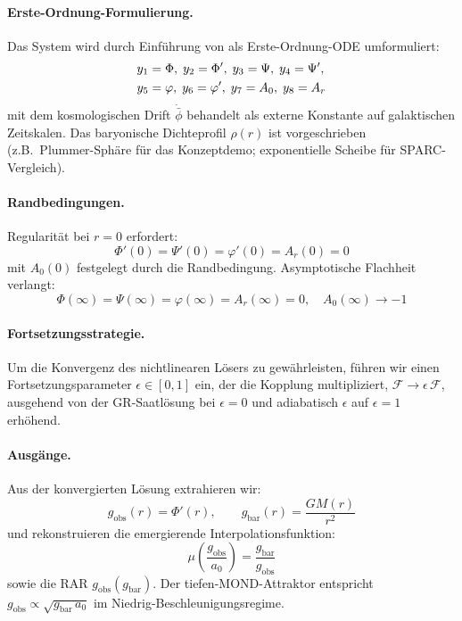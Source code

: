 \documentclass[aps,prd,twocolumn,superscriptaddress,nofootinbib]{revtex4-2}
\begin{document}
\paragraph{Erste-Ordnung-Formulierung.}
Das System wird durch Einf\"uhrung von als Erste-Ordnung-ODE umformuliert:
\begin{align}
y_1 &= \Phi,\; y_2 = \Phi',\; y_3 = \Psi,\; y_4 = \Psi', \notag \\
y_5 &= \varphi,\; y_6 = \varphi',\; y_7 = A_0,\; y_8 = A_r
\end{align}
mit dem kosmologischen Drift $\dot{\bar{\phi}}$ behandelt als externe Konstante auf galaktischen Zeitskalen. Das baryonische Dichteprofil $\rho(r)$ ist vorgeschrieben (z.B.\ Plummer-Sph\"are f\"ur das Konzeptdemo; exponentielle Scheibe f\"ur SPARC-Vergleich).

\paragraph{Randbedingungen.}
Regularit\"at bei $r = 0$ erfordert:
\begin{equation}
\Phi'(0) = \Psi'(0) = \varphi'(0) = A_r(0) = 0
\end{equation}
mit $A_0(0)$ festgelegt durch die Randbedingung. Asymptotische Flachheit verlangt:
\begin{equation}
\Phi(\infty) = \Psi(\infty) = \varphi(\infty) = A_r(\infty) = 0, \quad A_0(\infty) \to -1
\end{equation}

\paragraph{Fortsetzungsstrategie.}
Um die Konvergenz des nichtlinearen L\"osers zu gew\"ahrleisten, f\"uhren wir einen Fortsetzungsparameter $\epsilon \in [0,1]$ ein, der die Kopplung multipliziert, $\mathcal{F} \to \epsilon\,\mathcal{F}$, ausgehend von der GR-Saatl\"osung bei $\epsilon = 0$ und adiabatisch $\epsilon$ auf $\epsilon = 1$ erh\"ohend.

\paragraph{Ausg\"ange.}
Aus der konvergierten L\"osung extrahieren wir:
\begin{equation}
g_{\mathrm{obs}}(r) = \Phi'(r), \qquad g_{\mathrm{bar}}(r) = \frac{GM(r)}{r^2}
\end{equation}
und rekonstruieren die emergierende Interpolationsfunktion:
\begin{equation}
\mu\!\left(\frac{g_{\mathrm{obs}}}{a_0}\right) = \frac{g_{\mathrm{bar}}}{g_{\mathrm{obs}}}
\label{eq:mu_numerical}
\end{equation}
sowie die RAR $g_{\mathrm{obs}}(g_{\mathrm{bar}})$. Der tiefen-MOND-Attraktor entspricht $g_{\mathrm{obs}} \propto \sqrt{g_{\mathrm{bar}}\,a_0}$ im Niedrig-Beschleunigungsregime.
\end{document}
